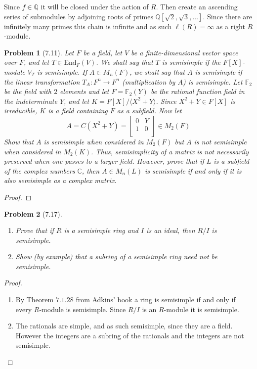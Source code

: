 \documentclass[10pt]{article}
\newcommand{\sk}{\vskip 10mm}
\newcommand{\bb}[1]{\mathbb{#1}}
\theoremstyle{plain}
\newtheorem{problem}{Problem}
\theoremstyle{remark}
\begin{document}
Since $f\in\bb{Q}$ it will be closed under the action of $R$.
Then create an ascending series of submodules by
adjoining roots of primes $\bb{Q}[\sqrt{2},\sqrt{3},\ldots]$.
Since there are infinitely many primes this chain is infinite
and as such $\ell(R)=\infty$ as a right $R$-module.

\sk

\begin{problem}[7.11]
  Let $F$ be a field, let $V$ be a finite-dimensional vector space over $F$,
  and let $T\in \text{End}_F(V)$. We shall say that $T$ is semisimple if the
  $F[X]$-module $V_T$ is semisimple. If $A\in M_n(F)$, we shall say that $A$
  is semisimple if the linear transformation $T_A: F^n\rightarrow F^n$
  (multiplication by $A$) is semisimple. Let $\bb{F}_2$ be the field with
  $2$ elements and let $F=\bb{F}_2(Y)$ be the rational function field in
  the indeterminate $Y$, and let $K=F[X]/\langle X^2+Y\rangle$. Since
  $X^2+Y\in F[X]$ is irreducible, $K$ is a field containing
  $F$ as a subfield. Now let
  \[
    A=C(X^2+Y)=
    \left[
      \begin{array}{cc}
        0&Y\\
        1&0\\
      \end{array}
    \right]
    \in M_2(F)
  \]
  Show that $A$ is semisimple when considered in $M_2(F)$ but $A$ is not
  semisimple when considered in $M_2(K)$. Thus, semisimplicity of a matrix
  is not necessarily preserved when one passes to a larger field. However,
  prove that if $L$ is a subfield of the complex numbers $\bb{C}$, then
  $A\in M_n(L)$ is semisimple if and only if it is also semisimple as a complex
  matrix.
\end{problem}

\begin{proof}
  
\end{proof}

\sk

\begin{problem}[7.17]
  \begin{enumerate}
  \item[(a)] Prove that if $R$ is a semisimple ring and $I$ is an ideal,
    then $R/I$ is semisimple.
  \item[(b)] Show (by example) that a subring of a semisimple ring need
    not be semisimple.
  \end{enumerate}
\end{problem}

\begin{proof}
  \begin{enumerate}
  \item[(a)] By Theorem $7.1.28$ from Adkins' book a ring is semisimple if and
  only if every $R$-module is semisimple. Since $R/I$ is an $R$-module
  it is semisimple.
\item[(b)] The rationals are simple, and as such semisimple, since they are
  a field. However the integers are a subring of the rationals and
  the integers are not semisimple.
  \end{enumerate}
\end{proof}

\end{document}
